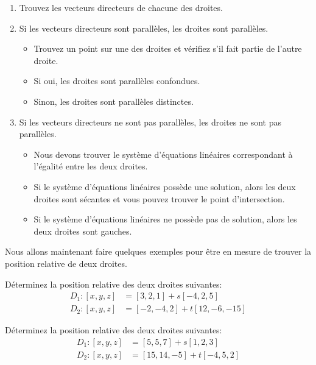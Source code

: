 \documentclass[]{book}
\providecommand{\tightlist}{%
  \setlength{\itemsep}{0pt}\setlength{\parskip}{0pt}}
\theoremstyle{definition}
\theoremstyle{definition}
\theoremstyle{definition}
\theoremstyle{remark}
\let\BeginKnitrBlock\begin \let\EndKnitrBlock\end
\begin{document}
\begin{enumerate}
\def\labelenumi{\arabic{enumi}.}
\item
  Trouvez les vecteurs directeurs de chacune des droites.
\item
  Si les vecteurs directeurs sont parallèles, les droites sont parallèles.

  \begin{itemize}
  \tightlist
  \item
    Trouvez un point sur une des droites et vérifiez s'il fait partie de l'autre droite.
  \item
    Si oui, les droites sont parallèles confondues.
  \item
    Sinon, les droites sont parallèles distinctes.
  \end{itemize}
\item
  Si les vecteurs directeurs ne sont pas parallèles, les droites ne sont pas parallèles.

  \begin{itemize}
  \tightlist
  \item
    Nous devons trouver le système d'équations linéaires correspondant à l'égalité entre les deux droites.
  \item
    Si le système d'équations linéaires possède une solution, alors les deux droites sont sécantes et vous pouvez trouver le point d'intersection.
  \item
    Si le système d'équations linéaires ne possède pas de solution, alors les deux droites sont gauches.
  \end{itemize}
\end{enumerate}

Nous allons maintenant faire quelques exemples pour être en mesure de trouver la position relative de deux droites.

\BeginKnitrBlock{example}
\protect\hypertarget{exm:droites-paralleles}{}{\label{exm:droites-paralleles} }Déterminez la position relative des deux droites suivantes:
\begin{align*}
D_1 : [x,y,z] &= [3,2,1]+s[-4,2,5] \\
D_2 : [x,y,z] &= [-2,-4,2]+t[12,-6,-15]
\end{align*}
\EndKnitrBlock{example}

\BeginKnitrBlock{example}
\protect\hypertarget{exm:droites-gauches}{}{\label{exm:droites-gauches} }Déterminez la position relative des deux droites suivantes:
\begin{align*}
D_1 : [x,y,z] &= [5,5,7]+s[1,2,3] \\
D_2 : [x,y,z] &= [15,14,-5]+t[-4,5,2]
\end{align*}
\EndKnitrBlock{example}
\end{document}
